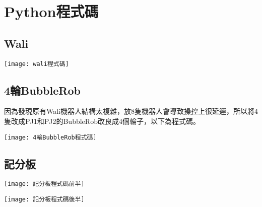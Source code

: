 \chapter{Python程式碼}
\section{Wali}

\begin{minipage}{\textwidth}
  \centering
  \texttt{[image: wali程式碼]}
  \label{fig:wali程式碼}
\end{minipage}

\section{4輪BubbleRob}
因為發現原有Wali機器人結構太複雜，放8隻機器人會導致操控上很延遲，所以將4隻改成PJ1和PJ2的BubbleRob改良成4個輪子，以下為程式碼。\\

\begin{minipage}{\textwidth}
  \centering
  \texttt{[image: 4輪BubbleRob程式碼]}
  \label{fig:4輪BubbleRob程式碼}
\end{minipage}

\section{記分板}

\begin{minipage}{\textwidth}
  \centering
  \texttt{[image: 記分板程式碼前半]}
  \label{fig:記分板程式碼前半}
\end{minipage}

\begin{minipage}{\textwidth}
  \centering
  \texttt{[image: 記分板程式碼後半]}
  \label{fig:記分板程式碼後半}
\end{minipage}
\newpage
